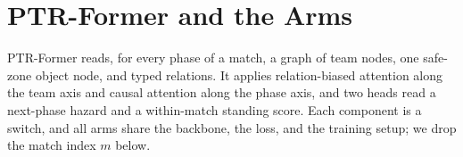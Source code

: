 \section{PTR-Former and the Arms}\label{sec:method}

PTR-Former reads, for every phase of a match, a graph of team nodes, one safe-zone object node, and typed relations. It applies relation-biased attention along the team axis and causal attention along the phase axis, and two heads read a next-phase hazard and a within-match standing score. Each component is a switch, and all arms share the backbone, the loss, and the training setup; we drop the match index $m$ below.

